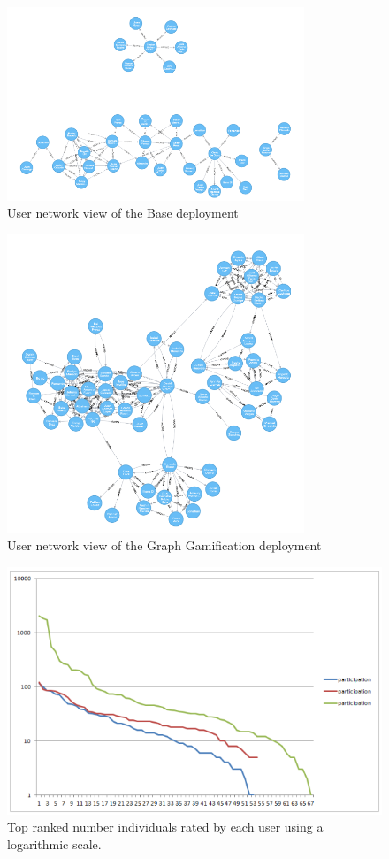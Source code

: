 \documentclass[conference]{IEEEtran}
\begin{document}
\begin{figure}[!t]
    \centering
        \includegraphics[width=3.5in]{img/user_known_2.png}
    \caption{User network view of the Base deployment}
    \label{fig:B-network}
\end{figure}
\begin{figure}[!t]
    \centering
        \includegraphics[width=3.5in]{img/user_known_3.png}
    \caption{User network view of the Graph Gamification deployment}
    \label{fig:GG-network}
\end{figure}
\begin{figure}[!t]
    \centering
        \includegraphics[width=5.5in]{img/comparison.png}
    \caption{Top ranked number individuals rated by each user using a
     logarithmic scale.} %
    \label{fig:top-ranked-participation}
\end{figure}
\end{document}
